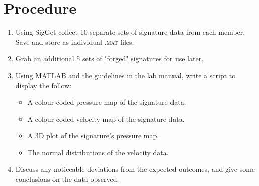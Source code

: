 \documentclass[a4paper]{article}
\begin{document}
\section{Procedure}
\begin{enumerate}
\item Using SigGet collect 10 separate sets of signature data from each member. Save and store as individual \textsc{.mat} files.
\item Grab an additional 5 sets of "forged" signatures for use later.
\item Using MATLAB and the guidelines in the lab manual, write a script to display the follow:
\begin{itemize}
\item A colour-coded pressure map of the signature data.
\item A colour-coded velocity map of the signature data.
\item A 3D plot of the signature's pressure map.
\item The normal distributions of the velocity data.
\end{itemize}
\item Discuss any noticeable deviations from the expected outcomes, and give some conclusions on the data observed.
\end{enumerate}

\pagebreak
\end{document}
